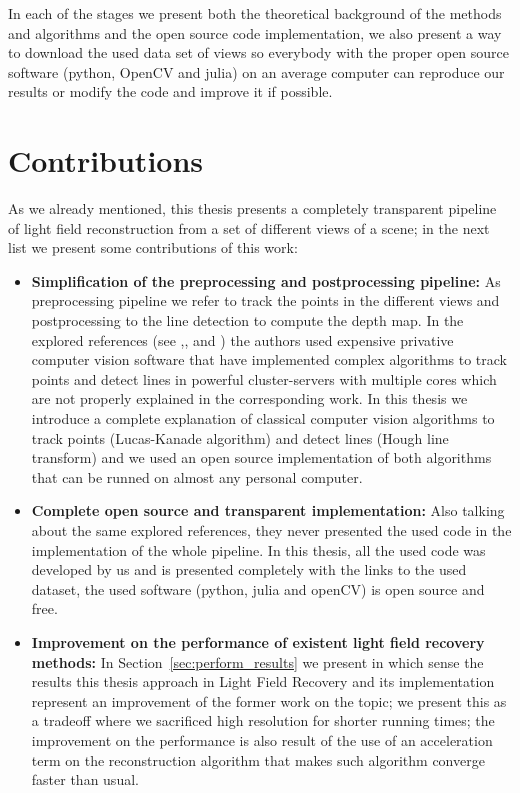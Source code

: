 In each of the stages we present both the theoretical background of the methods and algorithms and the open source code implementation, we also present a way to download the used data set of views so everybody with the proper open source software (python, OpenCV and julia) on an average computer can reproduce our results or modify the code and improve it if possible.

\section{Contributions}

As we already mentioned, this thesis presents a completely transparent pipeline of light field reconstruction from a set of different views of a scene; in the next list we present some contributions of this work:
 
\begin{itemize}
\item \textbf{Simplification of the preprocessing and postprocessing pipeline:} As preprocessing pipeline we refer to track the points in the different views and postprocessing to the line detection to compute the depth map. In the explored references (see \cite{Bolles},\cite{LF-Shearlets}, \cite{Kim-Disney} and \cite{CompressedMIT}) the authors used expensive privative computer vision software that have implemented complex algorithms to track points and detect lines in powerful cluster-servers with multiple cores which are not properly explained in the corresponding work. In this thesis we introduce a complete explanation of classical computer vision algorithms to track points (Lucas-Kanade algorithm) and detect lines (Hough line transform) and we used an open source implementation of both algorithms that can be runned on almost any personal computer.

\item \textbf{Complete open source and transparent implementation:} Also talking about the same explored references, they never presented the used code in the implementation of the whole pipeline. In this thesis, all the used code was developed by us and is presented completely with the links to the used dataset, the used software (python, julia and openCV) is open source and free.

\item \textbf{Improvement on the performance of existent light field recovery methods:} In Section~\ref{sec:perform_results} we present in which sense the results this thesis approach in Light Field Recovery and its implementation represent an improvement of the former work on the topic; we present this as a tradeoff where we sacrificed high resolution for shorter running times; the improvement on the performance is also result of the use of an acceleration term on the reconstruction algorithm that makes such algorithm converge faster than usual. 

\end{itemize}

